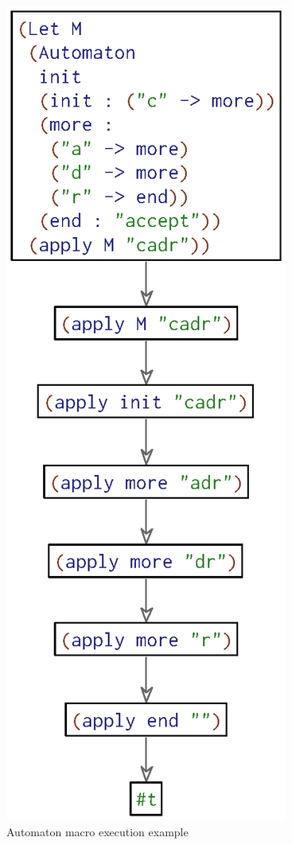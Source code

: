 \begin{figure}
  \mbox{}\hfill\includegraphics[width=0.45\columnwidth]{img/automaton-example}\hfill\mbox{}
\caption{Automaton macro execution example}
\label{fig:reval-automaton}
\end{figure}



